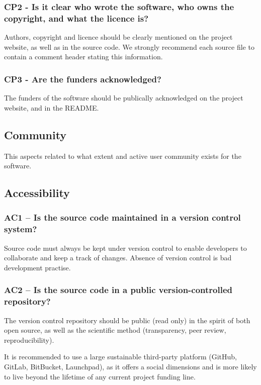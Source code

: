 \documentclass[a4paper,11pt]{article}
\begin{document}
\subsubsection{CP2 - Is it clear who wrote the software, who owns the
copyright, and what the licence is?}

Authors, copyright and licence should be clearly mentioned on the project
website, as well as in the source code.  We strongly recommend each source file
to contain a comment header stating this information.

\subsubsection{CP3 - Are the funders acknowledged?}

The funders of the software should be publically acknowledged on the project
website, and in the README.

\subsection{Community}

This aspects related to what extent and active user community exists for the
software.


\subsection{Accessibility}

\subsubsection{AC1 -- Is the source code maintained in a version control system?}

Source code must always be kept under version control to enable developers to
collaborate and keep a track of changes. Absence of version control is bad
development practise. 

\subsubsection{AC2 -- Is the source code in a public version-controlled repository?}

The version control repository should be public (read only) in the spirit of both open
source, as well as the scientific method (transparency, peer review,
reproducibility). 

It is recommended to use a large sustainable third-party platform (GitHub,
GitLab, BitBucket, Launchpad), as it offers a social dimensions and is more
likely to live beyond the lifetime of any current project funding line.
\end{document}

